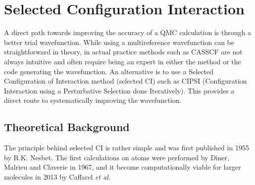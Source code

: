 \chapter{Selected Configuration Interaction}
\label{chap:sCI}
A direct path towards improving the accuracy of a QMC calculation is
through a better trial wavefunction.  While using a multireference
wavefunction can be straightforward in theory, in actual practice
methods such as CASSCF are not always intuitive and often require
being an expert in either the method or the code generating the
wavefunction.  An alternative is to use a Selected Configuration of
Interaction method (selected CI) such as CIPSI (Configuration
Interaction using a Perturbative Selection done Iteratively). This
provides a direct route to systematically improving the wavefunction.

\section{Theoretical Background}

The principle behind selected CI is rather simple and was first published in 1955 by R.K. Nesbet\cite{Nesbet1955}.
The first calculations on atoms were performed by Diner, Malrieu and Claverie\cite{Diner1967} in 1967, and it become computationally viable for larger molecules in 2013 by Caffarel \textit{et al.}\cite{Caffarel2013}  


